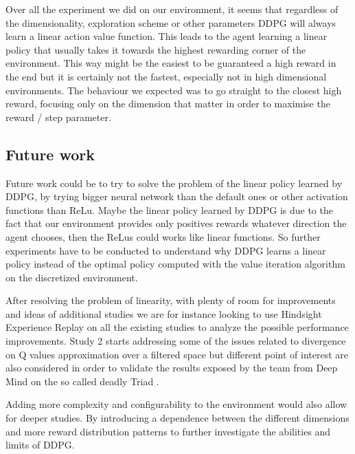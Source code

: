 \documentclass{article}
\begin{document}

Over all the experiment we did on our environment, it seems that regardless of the dimensionality, exploration scheme or other parameters DDPG will always learn a linear action value function. This leads to the agent learning a linear policy that usually takes it towards the highest rewarding corner of the environment. This way might be the easiest to be guaranteed a high reward in the end but it is certainly not the fastest, especially not in high dimensional environments.
The behaviour we expected was to go straight to the closest high reward, focusing only on the dimension that matter in order to maximise the reward / step parameter.

\subsection{Future work}

Future work could be to try to solve the problem of the linear policy learned by DDPG, by trying bigger neural network  than the default ones or other activation functions than ReLu. Maybe the linear policy learned by DDPG is due to the fact that our environment provides only positives rewards whatever direction the agent chooses, then the ReLus could works like linear functions. So further experiments have to be conducted to understand why DDPG learns a linear policy instead of the optimal policy computed with the value iteration algorithm on the discretized environment. 

After resolving the problem of linearity, with plenty of room for improvements and ideas of additional studies we are for instance looking to use Hindsight Experience Replay \cite{andrychowicz_hindsight_2017} on all the existing studies to analyze the possible performance improvements. Study 2 starts addressing some of the issues related to divergence on Q values approximation \cite{achiam_towards_2019} over a filtered space but different point of interest are also considered in order to validate the results exposed by the team from Deep Mind on the so called deadly Triad \cite{van_hasselt_deep_2018}.

Adding more complexity and configurability to the environment would also allow for deeper studies. By introducing a dependence between the different dimensions and more reward distribution patterns to further investigate the abilities and limits of DDPG.


  

\end{document}
